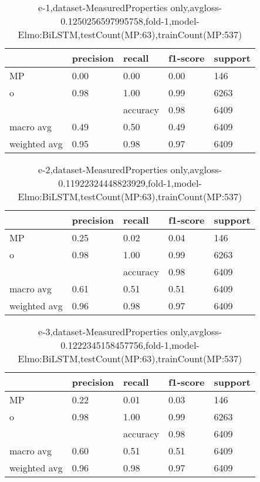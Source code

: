 \begin{table}[!ht] 
\centering
\caption{e-1,dataset-MeasuredProperties only,avgloss-0.1250256597995758,fold-1,model-Elmo:BiLSTM,testCount(MP:63),trainCount(MP:537)}\label{e-1data-mpS.tsv}
\begin{tabularx}{300pt}{|X|X|X|X|X|}
\hline
&precision&recall&f1-score&support\\
\hline
MP&0.00&0.00&0.00&146\\
\hline
o&0.98&1.00&0.99&6263\\
\hline
&&accuracy&0.98&6409\\
\hline
macro avg&0.49&0.50&0.49&6409\\
\hline
weighted avg&0.95&0.98&0.97&6409\\
\hline
\end{tabularx}
\end{table}
\begin{table}[!ht] 
\centering
\caption{e-2,dataset-MeasuredProperties only,avgloss-0.11922324448823929,fold-1,model-Elmo:BiLSTM,testCount(MP:63),trainCount(MP:537)}\label{e-2data-mpS.tsv}
\begin{tabularx}{300pt}{|X|X|X|X|X|}
\hline
&precision&recall&f1-score&support\\
\hline
MP&0.25&0.02&0.04&146\\
\hline
o&0.98&1.00&0.99&6263\\
\hline
&&accuracy&0.98&6409\\
\hline
macro avg&0.61&0.51&0.51&6409\\
\hline
weighted avg&0.96&0.98&0.97&6409\\
\hline
\end{tabularx}
\end{table}
\begin{table}[!ht] 
\centering
\caption{e-3,dataset-MeasuredProperties only,avgloss-0.1222345158457756,fold-1,model-Elmo:BiLSTM,testCount(MP:63),trainCount(MP:537)}\label{e-3data-mpS.tsv}
\begin{tabularx}{300pt}{|X|X|X|X|X|}
\hline
&precision&recall&f1-score&support\\
\hline
MP&0.22&0.01&0.03&146\\
\hline
o&0.98&1.00&0.99&6263\\
\hline
&&accuracy&0.98&6409\\
\hline
macro avg&0.60&0.51&0.51&6409\\
\hline
weighted avg&0.96&0.98&0.97&6409\\
\hline
\end{tabularx}
\end{table}
